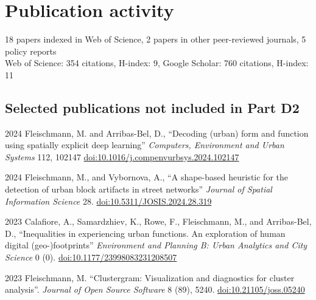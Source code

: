\documentclass[11pt,a4paper]{report}
\begin{document}
    \section*{Publication activity}

    18 papers indexed in Web of Science, 2 papers in other peer-reviewed journals, 5 policy reports \\
    Web of Science: 354 citations, H-index: 9, Google Scholar: 760 citations, H-index: 11

    \subsection*{Selected publications not included in Part D2}

    \begin{tablist}

        \item[2024] \tab{}Fleischmann, M. and Arribas-Bel, D., \enquote{Decoding (urban) form and function using spatially explicit deep learning} \textit{Computers, Environment and Urban Systems} 112, 102147 \href{https://doi.org/10.1016/j.compenvurbsys.2024.102147}{doi:10.1016/j.compenvurbsys.2024.102147}

        \item[2024] \tab{}Fleischmann, M., and Vybornova, A., \enquote{A shape-based heuristic for the detection of urban block artifacts in street networks} \textit{Journal of Spatial Information Science} 28. \href{https://doi.org/10.5311/JOSIS.2024.28.319}{doi:10.5311/JOSIS.2024.28.319}

        \item[2023] \tab{}Calafiore, A., Samardzhiev, K., Rowe, F., Fleischmann, M., and Arribas-Bel, D., \enquote{Inequalities in experiencing urban functions. An exploration of human digital (geo-)footprints} \textit{Environment and Planning B: Urban Analytics and City Science} 0 (0). \href{https://doi.org/10.1177/23998083231208507}{doi:10.1177/23998083231208507}

        \item[2023] \tab{}Fleischmann, M. \enquote{Clustergram: Visualization and diagnostics for cluster analysis}. \textit{Journal of Open Source Software} 8 (89), 5240. \href{https://doi.org/10.21105/joss.05240}{doi:10.21105/joss.05240}



\end{tablist}
\end{document}
